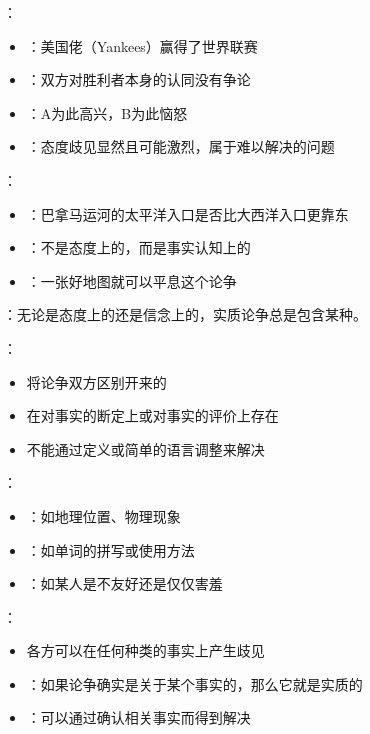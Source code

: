 \begin{examplebox}[title=实质论争的典型例子]
：
\begin{itemize}
  \item {}：美国佬（Yankees）赢得了世界联赛
  \item {}：双方对胜利者本身的认同没有争论
  \item {}：A为此高兴，B为此恼怒
  \item {}：态度歧见显然且可能激烈，属于难以解决的问题
\end{itemize}

：
\begin{itemize}
  \item {}：巴拿马运河的太平洋入口是否比大西洋入口更靠东
  \item {}：不是态度上的，而是事实认知上的
  \item {}：一张好地图就可以平息这个论争
\end{itemize}
\end{examplebox}

\begin{theorembox}[title=实质论争的基本特征]
：无论是态度上的还是信念上的，实质论争总是包含某种。

：
\begin{itemize}
  \item 将论争双方区别开来的
  \item 在对事实的断定上或对事实的评价上存在
  \item 不能通过定义或简单的语言调整来解决
\end{itemize}
\end{theorembox}

\begin{theorembox}[title=事实的多样性与论争的实质性]
：
\begin{itemize}
  \item {}：如地理位置、物理现象
  \item {}：如单词的拼写或使用方法
  \item {}：如某人是不友好还是仅仅害羞
\end{itemize}

：
\begin{itemize}
  \item 各方可以在任何种类的事实上产生歧见
  \item {}：如果论争确实是关于某个事实的，那么它就是实质的
  \item {}：可以通过确认相关事实而得到解决
\end{itemize}
\end{theorembox}

